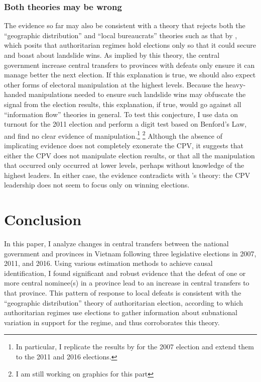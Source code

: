 \documentclass[12pt]{article}\usepackage[]{graphicx}\usepackage[]{color}
\newcommand{\1}{\mathbbm{1}}
\begin{document}
\subsubsection{Both theories may be wrong}

The evidence so far may also be consistent with a theory that rejects both the ``geographic distribution'' and ``local bureaucrats'' theories such as that by \cite{Geddes2005}, which posits that authoritarian regimes hold elections only so that it could secure and boast about landslide wins. As implied by this theory, the central government increase central transfers to provinces with defeats only ensure it can manage better the next election. If this explanation is true, we should also expect other forms of electoral manipulation at the highest levels. Because the heavy-handed manipulations needed to ensure such landslide wins may obfuscate the signal from the election results, this explanation, if true, would go against all ``information flow'' theories in general.  To test this conjecture, I use data on turnout for the 2011 election and perform a digit test based on Benford's Law, and find no clear evidence of manipulation.\footnote{In particular, I replicate the results by \cite{MaleskySchuler2011} for the 2007 election and extend them to the 2011 and 2016 elections.} \footnote{I am still working on graphics for this part} Although the absence of implicating evidence does not completely exonerate the CPV, it suggests that either the CPV does not manipulate election results, or that all the manipulation that occurred only occurred at lower levels, perhaps without knowledge of the highest leaders. In either case, the evidence contradicts with \cite{Geddes2005}'s theory: the CPV leadership does not seem to focus only on winning elections.

\section{Conclusion}
\label{sec:conclusion}

In this paper, I analyze changes in central transfers between the national government and provinces in Vietnam following three legislative elections in 2007, 2011, and 2016. Using various estimation methods to achieve causal identification, I found significant and robust evidence that the defeat of one or more central nominee(s) in a province lead to an increase in central transfers to that province. This pattern of response to local defeats is consistent with the ``geographic distribution'' theory of authoritarian election, according to which authoritarian regimes use elections to gather information about subnational variation in support for the regime, and thus corroborates this theory.
\end{document}
